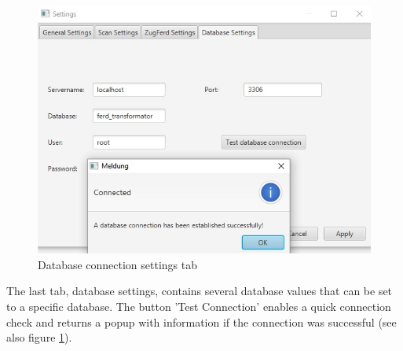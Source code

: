 \begin{figure}[ht!]
\centering
\includegraphics[scale=0.6]{Images/GUI/settings_Database.jpg}
\caption{Database connection settings tab \label{settings_Database}}
\end{figure}

The last tab, database settings, contains several database values that can be set to a specific database. The button 'Test Connection' enables a quick connection check and returns a popup with information if the connection was successful (see also figure \ref{settings_Database}). 